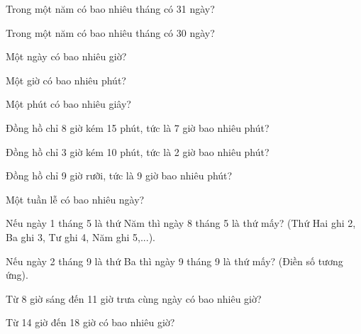 \begin{ex}
Trong một năm có bao nhiêu tháng có 31 ngày?
\end{ex}

\begin{ex}
Trong một năm có bao nhiêu tháng có 30 ngày?
\end{ex}

\begin{ex}
Một ngày có bao nhiêu giờ?
\end{ex}

\begin{ex}
Một giờ có bao nhiêu phút?
\end{ex}

\begin{ex}
Một phút có bao nhiêu giây?
\end{ex}

\begin{ex}
Đồng hồ chỉ 8 giờ kém 15 phút, tức là 7 giờ bao nhiêu phút?
\end{ex}

\begin{ex}
Đồng hồ chỉ 3 giờ kém 10 phút, tức là 2 giờ bao nhiêu phút?
\end{ex}

\begin{ex}
Đồng hồ chỉ 9 giờ rưỡi, tức là 9 giờ bao nhiêu phút?
\end{ex}

\begin{ex}
Một tuần lễ có bao nhiêu ngày?
\end{ex}

\begin{ex}
Nếu ngày 1 tháng 5 là thứ Năm thì ngày 8 tháng 5 là thứ mấy? (Thứ Hai ghi 2, Ba ghi 3, Tư ghi 4, Năm ghi 5,...).
\end{ex}

\begin{ex}
Nếu ngày 2 tháng 9 là thứ Ba thì ngày 9 tháng 9 là thứ mấy? (Điền số tương ứng).
\end{ex}

\begin{ex}
Từ 8 giờ sáng đến 11 giờ trưa cùng ngày có bao nhiêu giờ?
\end{ex}

\begin{ex}
Từ 14 giờ đến 18 giờ có bao nhiêu giờ?
\end{ex}
